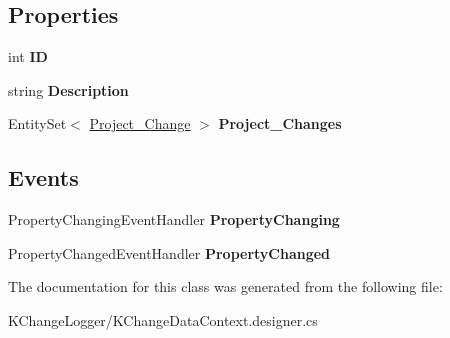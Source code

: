 \subsection*{Properties}
\begin{DoxyCompactItemize}
\item 
\hypertarget{class_k_change_logger_1_1_change___type_ae591ed66ae32b99d9d13e736db1268f6}{int {\bfseries I\-D}}\label{class_k_change_logger_1_1_change___type_ae591ed66ae32b99d9d13e736db1268f6}

\item 
\hypertarget{class_k_change_logger_1_1_change___type_a8824668ad26ce2508c727b979384f449}{string {\bfseries Description}}\label{class_k_change_logger_1_1_change___type_a8824668ad26ce2508c727b979384f449}

\item 
\hypertarget{class_k_change_logger_1_1_change___type_a4dbd0ac05c534967bd0a0ebd5803f83b}{Entity\-Set$<$ \hyperlink{class_k_change_logger_1_1_project___change}{Project\-\_\-\-Change} $>$ {\bfseries Project\-\_\-\-Changes}}\label{class_k_change_logger_1_1_change___type_a4dbd0ac05c534967bd0a0ebd5803f83b}

\end{DoxyCompactItemize}
\subsection*{Events}
\begin{DoxyCompactItemize}
\item 
\hypertarget{class_k_change_logger_1_1_change___type_a9574f73c45dabf703a5a97dd6cc5dabb}{Property\-Changing\-Event\-Handler {\bfseries Property\-Changing}}\label{class_k_change_logger_1_1_change___type_a9574f73c45dabf703a5a97dd6cc5dabb}

\item 
\hypertarget{class_k_change_logger_1_1_change___type_a6e7e294d3d632791c62a0eb9872efd99}{Property\-Changed\-Event\-Handler {\bfseries Property\-Changed}}\label{class_k_change_logger_1_1_change___type_a6e7e294d3d632791c62a0eb9872efd99}

\end{DoxyCompactItemize}


The documentation for this class was generated from the following file\-:\begin{DoxyCompactItemize}
\item 
K\-Change\-Logger/K\-Change\-Data\-Context.\-designer.\-cs\end{DoxyCompactItemize}
